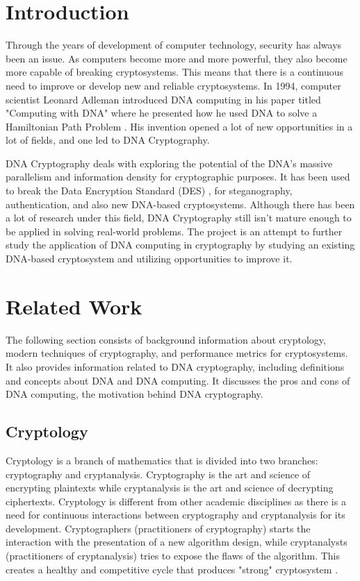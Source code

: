 \section{Introduction}

Through the years of development of computer technology, security has always been an issue. As computers become more and more powerful, they also become more capable of breaking cryptosystems. This means that there is a continuous need to improve or develop new and reliable cryptosystems. In 1994, computer scientist Leonard Adleman introduced DNA computing in his paper titled "Computing with DNA" where he presented how he used DNA to solve a Hamiltonian Path Problem \cite{adleman}. His invention opened a lot of new opportunities in a lot of fields, and one led to DNA Cryptography.

DNA Cryptography deals with exploring the potential of the DNA's massive parallelism and information density for cryptographic purposes. It has been used to break the Data Encryption Standard (DES) \cite{dna-computing}, for steganography, authentication, and also new DNA-based cryptosystems. Although there has been a lot of research under this field, DNA Cryptography still isn't mature enough to be applied in solving real-world problems. The project is an attempt to further study the application of DNA computing in cryptography by studying an existing DNA-based cryptosystem and utilizing opportunities to improve it.

\section{Related Work}

The following section consists of background information about cryptology, modern techniques of cryptography, and performance metrics for cryptosystems. It also provides information related to DNA cryptography, including definitions and concepts about DNA and DNA computing. It discusses the pros and cons of DNA computing, the motivation behind DNA cryptography.

\subsection{Cryptology}

Cryptology is a branch of mathematics that is divided into two branches: cryptography and cryptanalysis. Cryptography is the art and science of encrypting plaintexts while cryptanalysis is the art and science of decrypting ciphertexts. Cryptology is different from other academic disciplines as there is a need for continuous interactions between cryptography and cryptanalysis for its development. Cryptographers (practitioners of cryptography) starts the interaction with the presentation of a new algorithm design, while cryptanalysts (practitioners of cryptanalysis) tries to expose the flaws of the algorithm. This creates a healthy and competitive cycle that produces "strong" cryptosystem \cite{metrics}.

